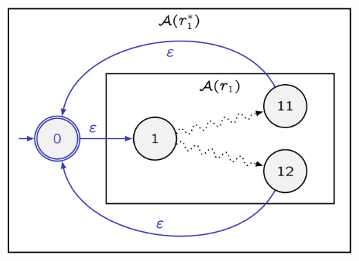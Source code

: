 \documentclass[12pt,a4paper]{article}
\begin{document}
\begin{minipage}[c]{0.49\textwidth}
	\includegraphics[width=\textwidth]{Bilder/KleeneStern.png}
\end{minipage}
\end{document}
